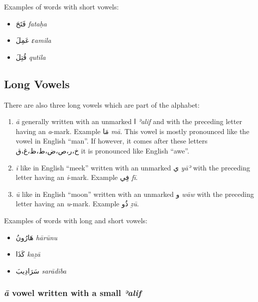 \documentclass[
  10pt,
]{book}
\providecommand{\tightlist}{%
  \setlength{\itemsep}{0pt}\setlength{\parskip}{0pt}}
\begin{document}
Examples of words with short vowels:

\begin{itemize}
\tightlist
\item
  \foreignlanguage{arabic}{فَتَحَ} \emph{fataḥa}
\item
  \foreignlanguage{arabic}{عَمِلَ} \emph{ɛamila}
\item
  \foreignlanguage{arabic}{قُتِلَ} \emph{qutila}
\end{itemize}

\subsection{Long Vowels}\label{long-vowels}

There are also three long vowels which are part of the alphabet:

\begin{enumerate}
\def\labelenumi{\arabic{enumi}.}
\tightlist
\item
  \emph{ā} generally written with an unmarked \foreignlanguage{arabic}{ا} \emph{ʾalif} and with the preceding letter having an \emph{a}-mark. Example \foreignlanguage{arabic}{مَا} \emph{mā}. This vowel is mostly pronounced like the vowel in English \enquote{man}. If however, it comes after these letters \foreignlanguage{arabic}{خ،ر،ص،ض،ط،ظ،غ،ق} it is pronounced like English \enquote{awe}.
\item
  \emph{ī} like in English \enquote{meek} written with an unmarked \foreignlanguage{arabic}{ي} \emph{yāʾ} with the preceding letter having an \emph{i}-mark. Example \foreignlanguage{arabic}{فِي} \emph{fī}.
\item
  \emph{ū} like in English \enquote{moon} written with an unmarked \foreignlanguage{arabic}{و} \emph{wāw} with the preceding letter having an \emph{u}-mark. Example \foreignlanguage{arabic}{ذُو} \emph{ẕū}.
\end{enumerate}

Examples of words with long and short vowels:

\begin{itemize}
\tightlist
\item
  \foreignlanguage{arabic}{هَارُونُ} \emph{hārūnu}
\item
  \foreignlanguage{arabic}{کَذَا} \emph{kaẕā}
\item
  \foreignlanguage{arabic}{سَرَادِيبَ} \emph{sarādība}
\end{itemize}

\subsubsection{\texorpdfstring{\emph{ā} vowel written with a small \emph{ʾalif}}{ā vowel written with a small ʾalif}}\label{a-vowel-written-with-a-small-ealif}
\end{document}
